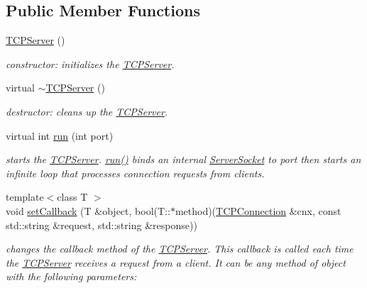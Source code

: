 \subsection*{Public Member Functions}
\begin{DoxyCompactItemize}
\item 
\mbox{\label{classcppu_1_1_t_c_p_server_a48074f8409f580f6cf7b0be80200f9f3}} 
\mbox{\hyperlink{classcppu_1_1_t_c_p_server_a48074f8409f580f6cf7b0be80200f9f3}{T\+C\+P\+Server}} ()
\begin{DoxyCompactList}\small\item\em constructor\+: initializes the \mbox{\hyperlink{classcppu_1_1_t_c_p_server}{T\+C\+P\+Server}}. \end{DoxyCompactList}\item 
\mbox{\label{classcppu_1_1_t_c_p_server_ababd20111e0cf4e14396433e56ca086e}} 
virtual \mbox{\hyperlink{classcppu_1_1_t_c_p_server_ababd20111e0cf4e14396433e56ca086e}{$\sim$\+T\+C\+P\+Server}} ()
\begin{DoxyCompactList}\small\item\em destructor\+: cleans up the \mbox{\hyperlink{classcppu_1_1_t_c_p_server}{T\+C\+P\+Server}}. \end{DoxyCompactList}\item 
virtual int \mbox{\hyperlink{classcppu_1_1_t_c_p_server_a98e00d62745812b17bdee9f07f2070c4}{run}} (int port)
\begin{DoxyCompactList}\small\item\em starts the \mbox{\hyperlink{classcppu_1_1_t_c_p_server}{T\+C\+P\+Server}}. \mbox{\hyperlink{classcppu_1_1_t_c_p_server_a98e00d62745812b17bdee9f07f2070c4}{run()}} binds an internal \mbox{\hyperlink{classcppu_1_1_server_socket}{Server\+Socket}} to {\itshape port} then starts an infinite loop that processes connection requests from clients. \end{DoxyCompactList}\item 
{\footnotesize template$<$class T $>$ }\\void \mbox{\hyperlink{classcppu_1_1_t_c_p_server_a7d4fdb93439015934004755fde72945b}{set\+Callback}} (T \&object, bool(T\+::$\ast$method)(\mbox{\hyperlink{classcppu_1_1_t_c_p_connection}{T\+C\+P\+Connection}} \&cnx, const std\+::string \&request, std\+::string \&response))
\begin{DoxyCompactList}\small\item\em changes the callback method of the \mbox{\hyperlink{classcppu_1_1_t_c_p_server}{T\+C\+P\+Server}}. This callback is called each time the \mbox{\hyperlink{classcppu_1_1_t_c_p_server}{T\+C\+P\+Server}} receives a request from a client. It can be any method of {\itshape object} with the following parameters\+: \end{DoxyCompactList}\item 

\end{DoxyCompactItemize}
